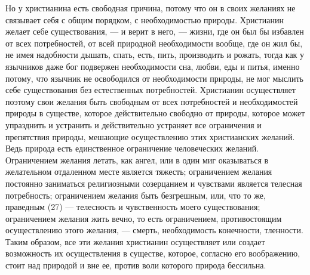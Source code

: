 \documentclass[12pt]{article}
\begin{document}
Но у христианина есть свободная причина, потому что он в своих желаниях не связывает себя с общим порядком, с необходимостью природы. Христианин желает себе существования, --- и верит в него, --- жизни, где он был бы избавлен от всех потребностей, от всей природной необходимости вообще, где он жил бы, не имея надобности дышать, спать, есть, пить, производить и рожать, тогда как у язычников даже бог подвержен необходимости сна, любви, еды и питья, именно потому, что язычник не освободился от необходимости природы, не мог мыслить себе существования без естественных потребностей. Христианин осуществляет поэтому свои желания быть свободным от всех потребностей и необходимостей природы в существе, которое действительно свободно от природы, которое может упразднить и устранить и действительно устраняет все ограничения и препятствия природы, мешающие осуществлению этих христианских желаний. Ведь природа есть единственное ограничение человеческих желаний. Ограничением желания летать, как ангел, или в один миг оказываться в желательном отдаленном месте является тяжесть; ограничением желания постоянно заниматься религиозными созерцанием и чувствами является телесная потребность; ограничением желания быть безгрешным, или, что то же, праведным (27) --- телесность и чувственность моего существования; ограничением желания жить вечно, то есть ограничением, противостоящим осуществлению этого желания, --- смерть, необходимость конечности, тленности. Таким образом, все эти желания христианин осуществляет или создает возможность их осуществления в существе, которое, согласно его воображению, стоит над природой и вне ее, против воли которого природа бессильна. 
\end{document}
